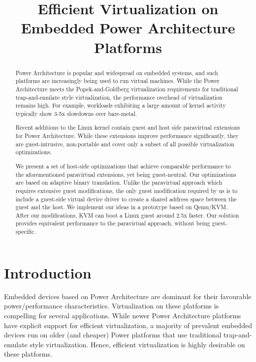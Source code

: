 \documentclass[10pt,twocolumn]{article}
\begin{document}
\title{Efficient Virtualization on Embedded Power Architecture Platforms}
\author{}
\date{}
\maketitle
\thispagestyle{empty}

\maketitle
\begin{abstract}
  Power Architecture is popular and widespread on embedded systems, and such
  platforms are
  increasingly
  being used to run virtual machines\cite{XXX}. While the Power Architecture meets the
  Popek-and-Goldberg virtualization requirements for traditional trap-and-emulate
  style virtualization, the performance overhead of virtualization remains high.
  For example, workloads exhibiting a large amount of kernel activity typically
  show 3-5x slowdowns over bare-metal.

  Recent additions to the Linux kernel contain guest and host side paravirtual
  extensions for Power Architecture. While these extensions improve performance
  significantly, they
  are guest-intrusive, non-portable and cover only a subset of all possible
  virtualization optimizations.

  We present a set of host-side optimizations that achieve comparable
  performance
  to the aforementioned paravirtual extensions, yet being
  guest-neutral. Our optimizations are based on adaptive binary translation.
  Unlike the paravirtual approach which requires extensive
  guest modifications, the only
  guest modification required by us is to include a guest-side virtual device driver
  to create a shared address space between the guest and the host.
  We implement our ideas in a prototype based on Qemu/KVM.
  After our modifications, KVM can boot a Linux guest around 2.5x faster. Our solution
  provides equivalent performance to
  the paravirtual approach, without being guest-specific.
\end{abstract}
\section{Introduction}
Embedded devices based on Power Architecture are dominant for their
favourable power/performance characteristics. Virtualization on these platforms is
compelling for several applications\cite{XXX}. While newer Power Architecture platforms
have explicit support for efficient virtualization\cite{XXX}, a majority of
prevalent embedded devices run on older (and cheaper) Power platforms that use
traditional trap-and-emulate style virtualization\cite{XXX}. Hence, efficient
virtualization is highly desirable on these platforms.
\end{document}
